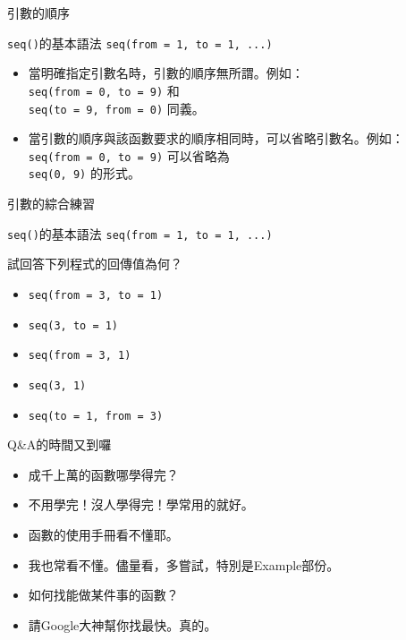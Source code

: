 \documentclass[14pt, aspectratio=43]{beamer}
\begin{document}
\begin{frame}[fragile]{引數的順序}

\begin{block}{\texttt{seq()}的基本語法}
\verb+seq(from = 1, to = 1, ...)+ \\
\end{block}

\begin{itemize}
\item 當明確指定引數名時，引數的順序無所謂。例如：\\ \verb+seq(from = 0, to = 9)+ 和 \\ \verb+seq(to = 9, from = 0)+ 同義。
\item 當引數的順序與該函數要求的順序相同時，可以省略引數名。例如：\\ \verb+seq(from = 0, to = 9)+ 可以省略為 \\ \verb+seq(0, 9)+ 的形式。
\end{itemize}
\end{frame}


\begin{frame}[fragile]{引數的綜合練習}

\begin{block}{\texttt{seq()}的基本語法}
\verb+seq(from = 1, to = 1, ...)+ \\
\end{block}

試回答下列程式的回傳值為何？
\begin{itemize}
\item \verb+seq(from = 3, to = 1)+
\item \verb+seq(3, to = 1)+
\item \verb+seq(from = 3, 1)+
\item \verb+seq(3, 1)+
\item \verb+seq(to = 1, from = 3)+
\end{itemize}
\end{frame}



\begin{frame}[fragile]{Q\&A的時間又到囉}
\begin{itemize}
\item[Q] 成千上萬的函數哪學得完？
\item[A] 不用學完！沒人學得完！學常用的就好。
\end{itemize}
\begin{itemize}
\item[Q] 函數的使用手冊看不懂耶。
\item[A] 我也常看不懂。儘量看，多嘗試，特別是Example部份。
\end{itemize}
\begin{itemize}
\item[Q] 如何找能做某件事的函數？
\item[A] 請Google大神幫你找最快。真的。
\end{itemize}
\end{frame}
\end{document}
